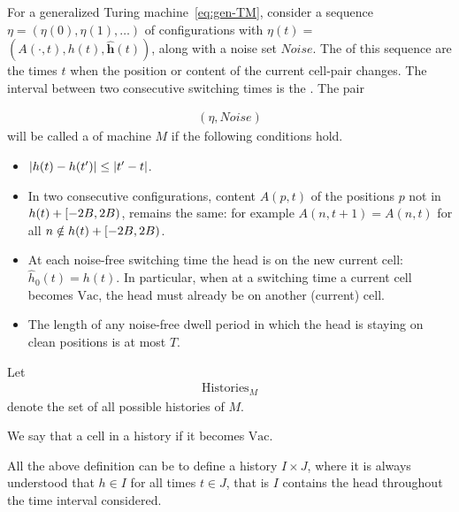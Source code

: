 \documentclass[11pt]{memoir}
\theoremstyle{definition} %
\renewcommand{\le}{\leq}
\renewcommand{\vek}[1]{\mathbf{#1}}
\def\B{B}
\newcommand{\Vacant}{\mathrm{Vac}}
\newcommand{\h}{h}
\newcommand{\hc}{\hat h}
\newcommand{\vhc}{\vek{\hat h}}
\newcommand{\Noise}{\mathit{Noise}}
\newcommand{\Tu}{T}
\newcommand{\Histories}{\mathrm{Histories}}
\begin{document}
\begin{definition}[History]\label{def:history}
  \begin{sloppyenv}
    For a generalized Turing machine~\eqref{eq:gen-TM}, 
consider a sequence \( \eta = (\eta(0), \eta(1), \dots) \) of configurations with
\( \eta(t) = \) \( (A(\cdot, t), \h(t), \vhc(t)) \), along with a noise set \( \Noise \).
The  of this sequence are the times \( t \) when 
the position or content of the current cell-pair changes.
The interval between two consecutive switching times is the .
The pair
      \end{sloppyenv}
    \begin{align*}
       (\eta,\Noise)
    \end{align*}
    will be called a  of machine \( M \) if the following conditions hold.
        \begin{itemize}
            \item \( \abs{\h(t) - \h(t')} \le \abs{t' - t} \).

            \item In two consecutive configurations, content \( A(p,t) \) of the positions \( p \)
              not in \( \h(t) + \lint{-2\B}{2\B} \), remains the same: for example
                  \( A(n,t+1) = A(n,t) \) for all \( n \notin \h(t) + \lint{-2\B}{2\B} \).
            \item At each noise-free switching time the head is on the new current cell:
\( \hc_{0}(t)=\h(t) \).
In particular, when at a switching time a current cell becomes
\( \Vacant \), the head must already be on another (current) cell.

            \item The length of any noise-free 
dwell period in which the head is staying on clean positions is at most \( \Tu \).

        \end{itemize}
    Let
        \begin{align*}
            \Histories_{M}
        \end{align*}
    denote the set of all possible histories of \( M \).

We say that a cell  in a history if it becomes \( \Vacant \).

All the above definition can be  to define a history
 \( I\times J \), 
where it is always understood that \( \h\in I \) for all times \( t\in J \),
that is \( I \) contains the head throughout the time interval considered.
\end{definition}
\end{document}
